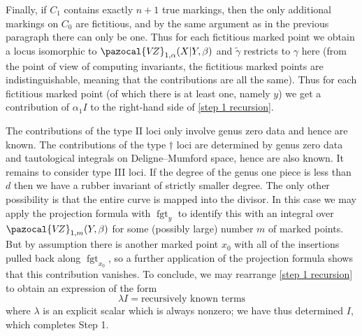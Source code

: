 \documentclass[11pt]{amsart}
\newcommand{\VZ}{\pazocal{V\!Z}}
\newcommand{\fgt}{\operatorname{fgt}}
\theoremstyle{definition}
\theoremstyle{definition}
\begin{document}
Finally, if $C_1$ contains exactly $n+1$ true markings, then the only additional markings on $C_0$ are fictitious, and by the same argument as in the previous paragraph there can only be one. Thus for each fictitious marked point we obtain a locus isomorphic to $\VZ_{1,\alpha}(X|Y,\beta)$ and $\tilde\gamma$ restricts to $\gamma$ here (from the point of view of computing invariants, the fictitious marked points are indistinguishable, meaning that the contributions are all the same). Thus for each fictitious marked point (of which there is at least one, namely $y$) we get a contribution of $\alpha_1 I$ to the right-hand side of \eqref{step 1 recursion}.

The contributions of the type II loci only involve genus zero data and hence are known. The contributions of the type $\dag$ loci are determined by genus zero data and tautological integrals on Deligne--Mumford space, hence are also known. It remains to consider type III loci. If the degree of the genus one piece is less than $d$ then we have a rubber invariant of strictly smaller degree. The only other possibility is that the entire curve is mapped into the divisor. In this case we may apply the projection formula with $\fgt_y$ to identify this with an integral over $\VZ_{1,m}(Y,\beta)$ for some (possibly large) number $m$ of marked points. But by assumption there is another marked point $x_0$ with all of the insertions pulled back along $\fgt_{x_0}$, so a further application of the projection formula shows that this contribution vanishes. To conclude, we may rearrange \eqref{step 1 recursion} to obtain an expression of the form
\begin{equation*} \lambda I = \text{recursively known terms} \end{equation*}
where $\lambda$ is an explicit scalar which is always nonzero; we have thus determined $I$, which completes Step 1.
\end{document}
